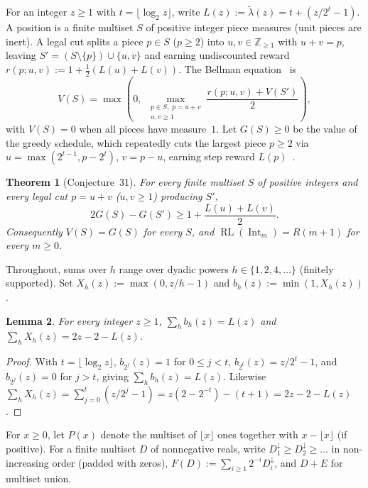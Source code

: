 \documentclass[11pt]{article}
\newtheorem{theorem}{Theorem}
\newtheorem{lemma}[theorem]{Lemma}
\newcommand{\RL}{\operatorname{RL}}
\newcommand{\Int}{\operatorname{Int}}
\begin{document}
For an integer $z \ge 1$ with $t = \lfloor \log_2 z \rfloor$, write $L(z) := \widetilde{\lambda}(z) = t + (z/2^t - 1)$. A position is a finite multiset $S$ of positive integer piece measures (unit pieces are inert). A legal cut splits a piece $p \in S$ ($p \ge 2$) into $u, v \in \mathbb{Z}_{\ge 1}$ with $u + v = p$, leaving $S' = (S \setminus \{p\}) \cup \{u, v\}$ and earning undiscounted reward $r(p; u, v) := 1 + \frac{1}{2}(L(u) + L(v))$. The Bellman equation~\cite[Equation~(2)]{DR2026} is
\begin{equation}\label{eq:bellman}
V(S) = \max\left(0,\; \max_{\substack{p \in S,\; p = u + v \\ u, v \ge 1}} \frac{r(p; u, v) + V(S')}{2}\right),
\end{equation}
with $V(S) = 0$ when all pieces have measure~$1$. Let $G(S) \ge 0$ be the value of the greedy schedule, which repeatedly cuts the largest piece $p \ge 2$ via $u = \max(2^{t-1}, p - 2^t)$, $v = p - u$, earning step reward $L(p)$~\cite[Theorem~30, Step~1]{DR2026}.

\begin{theorem}[Conjecture~31]\label{thm:conj31}
For every finite multiset $S$ of positive integers and every legal cut $p = u + v$ ($u, v \ge 1$) producing $S'$,
\[
2 G(S) - G(S') \ge 1 + \frac{L(u) + L(v)}{2}.
\]
Consequently $V(S) = G(S)$ for every $S$, and $\RL(\Int_m) = R(m + 1)$ for every $m \ge 0$.
\end{theorem}

Throughout, sums over $h$ range over dyadic powers $h \in \{1, 2, 4, \dots\}$ (finitely supported). Set $X_h(z) := \max(0, z/h - 1)$ and $b_h(z) := \min(1, X_h(z))$.

\begin{lemma}\label{lem:identities}
For every integer $z \ge 1$, $\sum_h b_h(z) = L(z)$ and $\sum_h X_h(z) = 2z - 2 - L(z)$.
\end{lemma}

\begin{proof}
With $t = \lfloor \log_2 z \rfloor$, $b_{2^j}(z) = 1$ for $0 \le j < t$, $b_{2^t}(z) = z/2^t - 1$, and $b_{2^j}(z) = 0$ for $j > t$, giving $\sum_h b_h(z) = L(z)$. Likewise $\sum_h X_h(z) = \sum_{j=0}^t (z/2^j - 1) = z(2 - 2^{-t}) - (t + 1) = 2z - 2 - L(z)$.
\end{proof}

For $x \ge 0$, let $P(x)$ denote the multiset of $\lfloor x \rfloor$ ones together with $x - \lfloor x \rfloor$ (if positive). For a finite multiset $D$ of nonnegative reals, write $D_1^\downarrow \ge D_2^\downarrow \ge \dots$ in non-increasing order (padded with zeros), $F(D) := \sum_{i \ge 1} 2^{-i} D_i^\downarrow$, and $D + E$ for multiset union.
\end{document}
